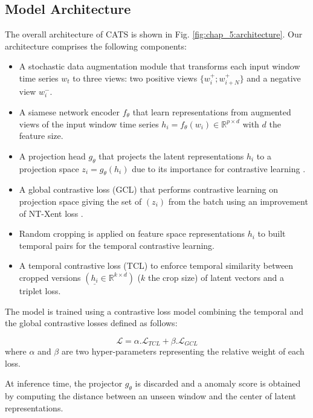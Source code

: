 \subsection{Model Architecture}
The overall architecture of CATS is shown in Fig. \ref{fig:chap_5:architecture}. Our architecture comprises the following components:
\begin{itemize}
    \item A stochastic data augmentation module that transforms each input window time series $w_t$ to three views: two positive views $\{w_i^{+}; w_{i+N}^{+}\}$ and a negative view $w_i^{-}$.
    \item A siamese network encoder $f_{\theta}$ that learn representations from augmented views of the input window time series $h_i = f_{\theta}(w_i) \in \mathbb{R}^{p \times d}$ with $d$ the feature size.
    \item A projection head $g_{\theta}$ that projects the latent representations $h_i$ to a projection space $z_i = g_{\theta}(h_i)$ due to its importance for contrastive learning \cite{chen2020simple}.
    \item A global contrastive loss (GCL) that performs contrastive learning on projection space giving the set of $(z_i)$ from the batch using an improvement of NT-Xent loss \cite{Sohn2016ImprovedDM}.
    \item Random cropping is applied on feature space representations $h_i$ to built temporal pairs for the temporal contrastive learning.
    \item A temporal contrastive loss (TCL) to enforce temporal similarity between cropped versions $(\underline{h_i} \in \mathbb{R}^{k \times d})$ ($k$ the crop size) of latent vectors and a triplet loss.

\end{itemize}

The model is trained using a contrastive loss model combining the temporal and the global contrastive losses defined as follows:

\begin{equation}\label{loss_total}
    \mathcal{L} = \alpha . \mathcal{L}_{TCL} + \beta . \mathcal{L}_{GCL}
\end{equation}
where $\alpha$ and $\beta$ are two hyper-parameters representing the relative weight of each loss. %

At inference time, the projector $g_{\theta}$ is discarded and a anomaly score is obtained by computing the distance between an unseen window and the center of latent representations.

